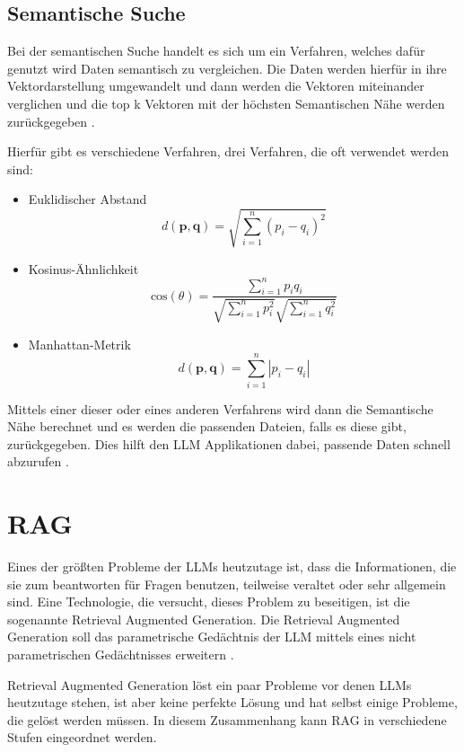 \subsection*{Semantische Suche}
\label{s:intro:semsea}
Bei der semantischen Suche handelt es sich um ein Verfahren, welches 
dafür genutzt wird Daten semantisch zu vergleichen. 
Die Daten werden hierfür in ihre Vektordarstellung umgewandelt und dann werden 
die Vektoren miteinander verglichen und die top k Vektoren mit der höchsten 
Semantischen Nähe werden zurückgegeben \cite{NVIDIAGlossaryWhat, chandrasekaranEvolutionSemanticSimilarity2022, WhatSemanticSearch}.\par
Hierfür gibt es verschiedene Verfahren, drei Verfahren, die oft verwendet 
werden sind: 
\begin{itemize}
    \item Euklidischer Abstand
    \begin{equation}
        d(\mathbf{p}, \mathbf{q}) = \sqrt{\sum_{i=1}^{n} (p_i - q_i)^2}
    \end{equation}
    \item Kosinus-Ähnlichkeit 
    \begin{equation}
        \text{cos}(\theta) = \frac{\sum_{i=1}^{n} p_i q_i}{\sqrt{\sum_{i=1}^{n} p_i^2} \sqrt{\sum_{i=1}^{n} q_i^2}}
    \end{equation}
    \item Manhattan-Metrik
    \begin{equation}
        d(\mathbf{p}, \mathbf{q}) = \sum_{i=1}^{n} |p_i - q_i|
    \end{equation}
\end{itemize}
Mittels einer dieser oder eines anderen Verfahrens wird dann die Semantische 
Nähe berechnet und es werden die passenden Dateien, falls es diese gibt, zurückgegeben.
Dies hilft den LLM Applikationen dabei, passende Daten schnell abzurufen \cite{NVIDIAGlossaryWhat, chandrasekaranEvolutionSemanticSimilarity2022, WhatSemanticSearch}.

\section{RAG}
\label{s:intro:rag}
Eines der größten Probleme der LLMs heutzutage ist, dass die Informationen, die sie zum beantworten für Fragen benutzen, 
teilweise veraltet oder sehr allgemein sind. Eine Technologie, 
die versucht, dieses Problem zu beseitigen, ist die sogenannte Retrieval Augmented Generation. 
Die Retrieval Augmented Generation soll das parametrische Gedächtnis der LLM
mittels eines nicht parametrischen Gedächtnisses erweitern \cite{lewisRetrievalAugmentedGenerationKnowledgeIntensive2021}. \par 
Retrieval Augmented Generation löst ein paar Probleme vor denen LLMs heutzutage 
stehen, ist aber keine perfekte Lösung und hat selbst einige Probleme, die gelöst werden müssen. 
In diesem Zusammenhang kann RAG in verschiedene Stufen 
eingeordnet werden.\cite{gaoRetrievalAugmentedGenerationLarge2024}

